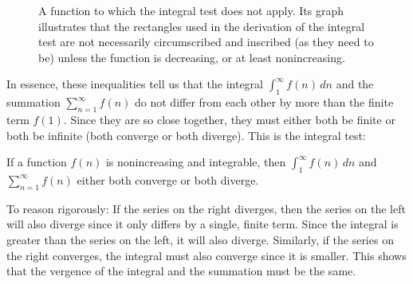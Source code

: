 \documentclass{myarticle}
\theoremstyle{nospace}
\newtheorem{old series theorem}{Theorem}
\newenvironment{series theorem}{\begin{mdframed}\begin{old series theorem}}{\end{old series theorem}\end{mdframed}}
\begin{document}
\begin{figure}[htb!] \centering
{}
\caption{A function to which the integral test does not apply. Its graph illustrates that the rectangles used in the derivation of the integral test are not necessarily circumscribed and inscribed (as they need to be) unless the function is decreasing, or at least nonincreasing.}
\label{fig:integral test fails}
\end{figure}

In essence, these inequalities tell us that the integral $\int_1^\infty f(n) \,dn$ and the summation $\sum_{n=1}^\infty f(n)$ do not differ from each other by more than the finite term $f(1)$. Since they are so close together, they must either both be finite or both be infinite (both converge or both diverge). This is the integral test:

\begin{series theorem} If a function $f(n)$ is nonincreasing and integrable, then $\int_1^\infty f(n) \,dn$ and $\sum_{n=1}^\infty f(n)$ either both converge or both diverge. \end{series theorem}

To reason rigorously: If the series on the right diverges, then the series on the left will also diverge since it only differs by a single, finite term. Since the integral is greater than the series on the left, it will also diverge. Similarly, if the series on the right converges, the integral must also converge since it is smaller. This shows that the vergence of the integral and the summation must be the same.
\end{document}
